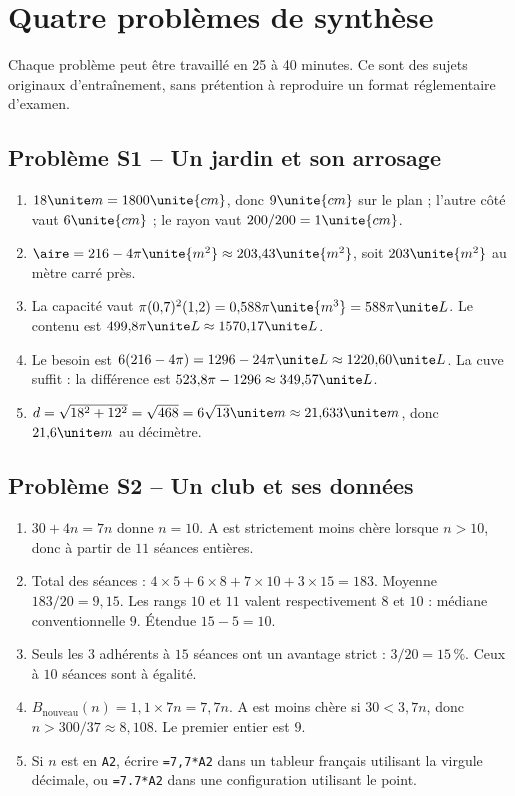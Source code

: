 \chapter{Quatre problèmes de synthèse}

Chaque problème peut être travaillé en 25 à 40 minutes. Ce sont des sujets originaux d’entraînement, sans prétention à reproduire un format réglementaire d’examen.

\section*{Problème S1 -- Un jardin et son arrosage}

\begin{enumerate}
\item $18\unite m=1800\unite{cm}$, donc $9\unite{cm}$ sur le plan ; l'autre côté vaut $6\unite{cm}$ ; le rayon vaut $200/200=1\unite{cm}$.
\item $\aire=216-4\pi\unite{m^2}\approx203{,}43\unite{m^2}$, soit $203\unite{m^2}$ au mètre carré près.
\item La capacité vaut $\pi(0{,}7)^2(1{,}2)=0{,}588\pi\unite{m^3}=588\pi\unite L$. Le contenu est $499{,}8\pi\unite L\approx1570{,}17\unite L$.
\item Le besoin est $6(216-4\pi)=1296-24\pi\unite L\approx1220{,}60\unite L$. La cuve suffit : la différence est $523{,}8\pi-1296\approx349{,}57\unite L$.
\item $d=\sqrt{18^2+12^2}=\sqrt{468}=6\sqrt{13}\unite m\approx21{,}633\unite m$, donc $21{,}6\unite m$ au décimètre.
\end{enumerate}

\section*{Problème S2 -- Un club et ses données}

\begin{enumerate}
\item $30+4n=7n$ donne $n=10$. A est strictement moins chère lorsque $n>10$, donc à partir de $11$ séances entières.
\item Total des séances : $4\times5+6\times8+7\times10+3\times15=183$. Moyenne $183/20=9{,}15$. Les rangs $10$ et $11$ valent respectivement $8$ et $10$ : médiane conventionnelle $9$. Étendue $15-5=10$.
\item Seuls les $3$ adhérents à $15$ séances ont un avantage strict : $3/20=15\,\%$. Ceux à $10$ séances sont à égalité.
\item $B_{\mathrm{nouveau}}(n)=1{,}1\times7n=7{,}7n$. A est moins chère si $30<3{,}7n$, donc $n>300/37\approx8{,}108$. Le premier entier est $9$.
\item Si $n$ est en \texttt{A2}, écrire \texttt{=7,7*A2} dans un tableur français utilisant la virgule décimale, ou \texttt{=7.7*A2} dans une configuration utilisant le point.
\end{enumerate}

